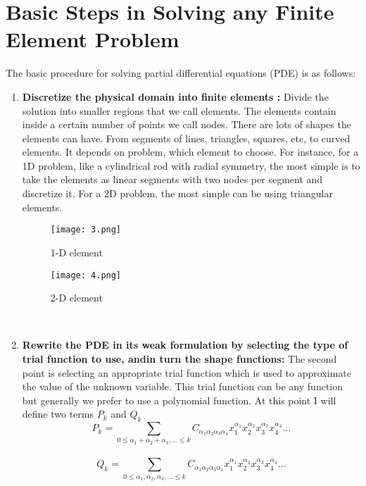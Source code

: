 \documentclass[9pt]{article}
\begin{document}
\section{Basic Steps in Solving any Finite Element Problem}
The basic procedure for solving partial differential equations (PDE) is as
follows:

\begin{enumerate}

  \item \textbf{Discretize the physical domain into finite elements :} Divide the solution into smaller regions that we call elements. The elements contain inside a certain number of points we call nodes. There are lots of shapes the elements can have. From segments of lines, triangles, squares, etc, to curved elements. It depends on problem, which element to choose. For instance, for a 1D problem, like a cylindrical rod with radial symmetry, the most simple is to take the elements as linear segments with two nodes per segment and
discretize it. For a 2D problem, the most simple can be using triangular elements.\\
\begin{figure}[!h]
    	\centering
    	\begin{minipage}[t]{4cm}
    		\centering
    		\texttt{[image: 3.png]}
    		\caption{1-D element}
    	\end{minipage}
    	\hspace{3cm}
    	\begin{minipage}[t]{4cm}
    		\centering
    		\texttt{[image: 4.png]}
    		\caption{2-D element}
    	\end{minipage}
    \end{figure}
   \\ 
 \item \textbf{ Rewrite the PDE in its weak formulation by selecting the type of trial function to use, andin turn the shape functions:} The second point is selecting an appropriate trial function which is used to approximate the value of the unknown variable. 
  This trial function can be any function but generally we prefer to use a polynomial function.
  At this point I will define two terms $P_k$ and $Q_k$\\
  \[
  P_k = \sum_{0 \leq \alpha_1+\alpha_2+\alpha_3,... \leq k} C_{\alpha_1\alpha_2\alpha_3\alpha_4} x_1^{\alpha_1}x_2^{\alpha_2}x_3^{\alpha_3}x_4^{\alpha_4}...
\]
\\
\[
  Q_k = \sum_{0 \leq \alpha_1,\alpha_2,\alpha_3,... \leq k} C_{\alpha_1\alpha_2\alpha_3\alpha_4} x_1^{\alpha_1}x_2^{\alpha_2}x_3^{\alpha_3}x_4^{\alpha_4}...
\]
\end{enumerate}
\end{document}
